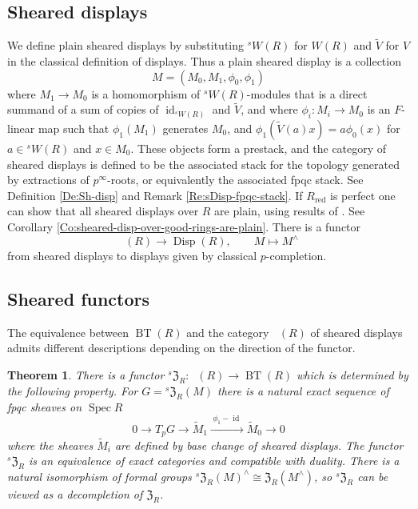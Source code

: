 \documentclass[a4paper,11pt]{amsart}
\theoremstyle{plain}
\newtheorem{ThmABC}[LeABC]{Theorem}
\theoremstyle{definition}
\theoremstyle{remark}
\newcommand{\beqn}{\begin{equation}}
\newcommand{\eeqn}{\end{equation}}
\newcommand{\uM}{M} %
\numberwithin{equation}{section}
\newcommand{\FZ}{\mathfrak{Z}}
\DeclareMathOperator{\id}{id}
\DeclareMathOperator{\red}{red}
\DeclareMathOperator{\BT}{BT}
\DeclareMathOperator{\Disp}{Disp}
\DeclareMathOperator{\sDisp}{{}^sDisp}
\DeclareMathOperator{\Spec}{Spec}
\newcommand{\sFZ}{{}^s\FZ}
\newcommand{\sW}{{}^sW}
\begin{document}
\subsection{Sheared displays}
\label{Se:Intro-sheared-disp}

We define plain sheared displays by substituting $\sW(R)$ for $W(R)$ and $\tilde V$ for $V$ in the classical definition of displays. Thus a plain sheared display is a collection 
\[
\uM=(M_0,M_1,\phi_0,\phi_1)
\] 
where $M_1\to M_0$ is a homomorphism of $\sW(R)$-modules that is a direct summand of a sum of copies of $\id_{\sW(R)}$ and $\tilde V$,
and where $\phi_i\colon M_i\to M_0$ is an $F$-linear map such that $\phi_1(M_1)$ generates $M_0$, and $\phi_1(\tilde V(a)x)=a\phi_0(x)$ for $a\in\sW(R)$ and $x\in M_0$.
These objects form a prestack, and the category of sheared displays is 
defined to be the associated stack for the topology generated by extractions of $p^\infty$-roots, or equivalently the associated fpqc stack.
See Definition \ref{De:Sh-disp} and Remark \ref{Re:sDisp-fpqc-stack}.
If $R_{\red}$ is perfect one can show that all sheared displays over $R$ are plain, using results of \cite{BMVZ}. 
See Corollary \ref{Co:sheared-disp-over-good-rings-are-plain}.
There is a functor 
\[
\sDisp(R)\to\Disp(R), \qquad 
\uM\mapsto\uM^\wedge
\] 
from sheared displays to displays given by classical $p$-completion. 

\subsection{Sheared functors}

The equivalence between $\BT(R)$ and the category $\sDisp(R)$ of sheared displays admits different descriptions depending on the direction of the functor.

\begin{ThmABC}
\label{Th:Intro-sFZR}
There is a functor\/ $\sFZ_R\colon \sDisp(R)\to\BT(R)$ which is determined by the following property. For $G=\sFZ_R(\uM)$ there is a
natural exact sequence of fpqc sheaves on $\Spec R$
\beqn
\label{Eq:TpG-M1-M0}
0\longrightarrow T_pG\longrightarrow\tilde M_1\xrightarrow{\;\phi_1-{\id}\;}\tilde M_0\longrightarrow 0
\eeqn
where the sheaves $\tilde M_i$ are defined by base change of sheared displays. The functor $\sFZ_R$ is an equivalence of exact categories and compatible with duality. There is a natural isomorphism of formal groups $\sFZ_R(\uM)^\wedge\cong\FZ_R(\uM^\wedge)$, so $\sFZ_R$ can be viewed as a decompletion of $\FZ_R$.
\end{ThmABC}
\end{document}
